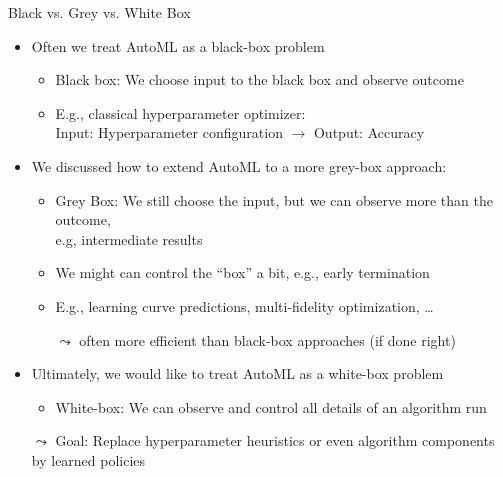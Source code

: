 \begin{frame}[c]{Black vs. Grey vs. White Box}

\begin{itemize}
	\item Often we treat AutoML as a \alert{black-box problem}
	\begin{itemize}
		\item Black box: We choose input to the black box and observe outcome
		\pause
		\item E.g., classical hyperparameter optimizer:\\ Input: Hyperparameter configuration $\to$ Output: Accuracy
	\end{itemize}
   \pause
   \smallskip
   \item We discussed how to extend AutoML to a more \alert{grey-box approach}:	
   \begin{itemize}
     	\item Grey Box: We still choose the input, but we can observe more than the outcome,\\ e.g, intermediate results
     	\pause
     	\item We might can control the ``box'' a bit,  e.g., early termination
     	\pause
        \item E.g., learning curve predictions, multi-fidelity optimization, \ldots
        \pause
        \item[$\leadsto$] often more efficient than black-box approaches (if done right)
   \end{itemize}
   \pause
   \smallskip
   \item Ultimately, we would like to treat AutoML as a \alert{white-box problem}
   \begin{itemize}
     	\item White-box: We can observe and control all details of an algorithm run
   \end{itemize}
	\pause
	\medskip
   \item[$\leadsto$] Goal: \alert{Replace hyperparameter heuristics or even algorithm components by learned policies}
\end{itemize}


\end{frame}
